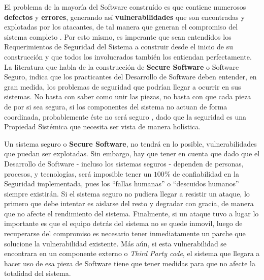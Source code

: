 El problema de la mayoría del Software construído es que contiene numerosos \textbf{defectos} y \textbf{errores}, generando así \textbf{vulnerabilidades} que son encontradas y explotadas por los atacantes, de tal manera que generan el compromiso del sistema completo \cite{goertzel2007software}. Por esto mismo, es imperante que sean entendidos los Requerimientos de Seguridad del Sistema a construir desde el inicio de su construcción y que todos los involucrados también los entiendan perfectamente. La literatura que habla de la construcción de \textbf{Secure Software} o Software Seguro, indica que los practicantes del Desarrollo de Software deben entender, en gran medida, los problemas de seguridad que podrían llegar a ocurrir en sus sistemas. No basta con saber como unir las piezas, no basta con que cada pieza de por si sea segura, si los componentes del sistema no actuan de forma coordinada, probablemente éste no será seguro \cite{fernandez2013security}, dado que la seguridad es una Propiedad Sistémica que necesita ser vista de manera holística.  

Un sistema seguro o \textbf{Secure Software}, no tendrá en lo posible, vulnerabilidades que puedan ser explotadas. Sin embargo, hay que tener en cuenta que dado que el Desarrollo de Software - incluso los sistemas seguros - dependen de personas, procesos, y tecnologías, será imposible tener un \(100\%\) de confiabilidad en la Seguridad implementada, pues los ``fallas humanas'' o ``descuidos humanos'' siempre existirán. Si el sistema seguro no pudiera llegar a resistir un ataque, lo primero que debe intentar es aislarse del resto y degradar con gracia, de manera que no afecte el rendimiento del sistema. Finalmente, si un ataque tuvo a lugar lo importante es que el equipo detrás del sistema no se quede inmovil, luego de recuperarse del compromiso es necesario tener inmediatamente un parche que solucione la vulnerabilidad existente. Más aún, si esta vulnerabilidad se encontrara en un componente externo o \textit{Third Party code}, el sistema que llegara a hacer uso de esa pieza de Software tiene que tener medidas para que no afecte la totalidad del sistema.





